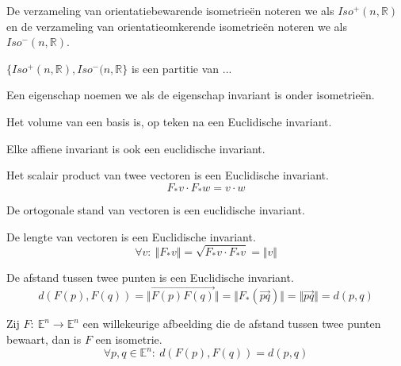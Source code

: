 \documentclass[main.tex]{subfiles}
\begin{document}
\begin{de}
  De verzameling van orientatiebewarende isometrie\"en noteren we als $Iso^{+}(n,\mathbb{R})$ en de verzameling van orientatieomkerende isometrie\"en noteren we als $Iso^{-}(n,\mathbb{R})$.
\end{de}

\begin{st}
  $\{ Iso^{+}(n,\mathbb{R}), Iso^{-}(n,\mathbb{R} \}$ is een partitie van ...
\end{st}

\begin{de}
  Een eigenschap noemen we  als de eigenschap invariant is onder isometrie\"en.
\end{de}

\begin{st}
  Het volume van een basis is, op teken na een Euclidische invariant.
\end{st}

\begin{st}
  Elke affiene invariant is ook een euclidische invariant.
\end{st}

\begin{st}
  Het scalair product van twee vectoren is een Euclidische invariant.
\[ F_{*}v \cdot F_{*}w = v \cdot w \]
\end{st}

\begin{st}
  De ortogonale stand van vectoren is een euclidische invariant.
\end{st}

\begin{st}
  De lengte van vectoren is een Euclidische invariant.
\[ \forall v:\ \Vert F_{*}v \Vert = \sqrt{F_{*}v \cdot F_{*}v} = \Vert v \Vert \]
\end{st}

\begin{st}
  De afstand tussen twee punten is een Euclidische invariant.
\[ d(F(p),F(q)) = \Vert \overrightarrow{F(p)F(q)} \Vert = \Vert F_{*}(\overrightarrow{pq}) \Vert = \Vert \overrightarrow{pq} \Vert = d(p,q) \]
\end{st}

\begin{st}
  Zij $F:\ \mathbb{E}^{n}\rightarrow \mathbb{E}^{n}$ een willekeurige afbeelding die de afstand tussen twee punten bewaart, dan is $F$ een isometrie.
  \[ \forall p,q \in \mathbb{E}^{n}:\  d(F(p),F(q)) = d(p,q) \]
\end{st}
\end{document}
